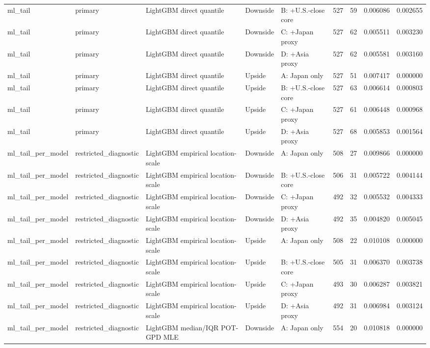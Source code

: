 \begin{tabular}{lllllrrrr}
ml\_tail & primary & LightGBM direct quantile & Downside & B: +U.S.-close core & 527 & 59 & 0.006086 & 0.002655 \\
ml\_tail & primary & LightGBM direct quantile & Downside & C: +Japan proxy & 527 & 62 & 0.005511 & 0.003230 \\
ml\_tail & primary & LightGBM direct quantile & Downside & D: +Asia proxy & 527 & 62 & 0.005581 & 0.003160 \\
ml\_tail & primary & LightGBM direct quantile & Upside & A: Japan only & 527 & 51 & 0.007417 & 0.000000 \\
ml\_tail & primary & LightGBM direct quantile & Upside & B: +U.S.-close core & 527 & 63 & 0.006614 & 0.000803 \\
ml\_tail & primary & LightGBM direct quantile & Upside & C: +Japan proxy & 527 & 61 & 0.006448 & 0.000968 \\
ml\_tail & primary & LightGBM direct quantile & Upside & D: +Asia proxy & 527 & 68 & 0.005853 & 0.001564 \\
ml\_tail\_per\_model & restricted\_diagnostic & LightGBM empirical location-scale & Downside & A: Japan only & 508 & 27 & 0.009866 & 0.000000 \\
ml\_tail\_per\_model & restricted\_diagnostic & LightGBM empirical location-scale & Downside & B: +U.S.-close core & 506 & 31 & 0.005722 & 0.004144 \\
ml\_tail\_per\_model & restricted\_diagnostic & LightGBM empirical location-scale & Downside & C: +Japan proxy & 492 & 32 & 0.005532 & 0.004333 \\
ml\_tail\_per\_model & restricted\_diagnostic & LightGBM empirical location-scale & Downside & D: +Asia proxy & 492 & 35 & 0.004820 & 0.005045 \\
ml\_tail\_per\_model & restricted\_diagnostic & LightGBM empirical location-scale & Upside & A: Japan only & 508 & 22 & 0.010108 & 0.000000 \\
ml\_tail\_per\_model & restricted\_diagnostic & LightGBM empirical location-scale & Upside & B: +U.S.-close core & 505 & 31 & 0.006370 & 0.003738 \\
ml\_tail\_per\_model & restricted\_diagnostic & LightGBM empirical location-scale & Upside & C: +Japan proxy & 493 & 30 & 0.006287 & 0.003821 \\
ml\_tail\_per\_model & restricted\_diagnostic & LightGBM empirical location-scale & Upside & D: +Asia proxy & 492 & 31 & 0.006984 & 0.003124 \\
ml\_tail\_per\_model & restricted\_diagnostic & LightGBM median/IQR POT-GPD MLE & Downside & A: Japan only & 554 & 20 & 0.010818 & 0.000000 \\

\end{tabular}
